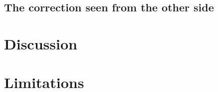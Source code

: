 \documentclass[final,1p,times]{elsarticle}
\begin{document}
\subsection{The correction seen from the other side}
\label{sec:results-pooled}


\section{Discussion}
\label{sec:discussion}

\section{Limitations}
\label{sec:limitations}
\end{document}

